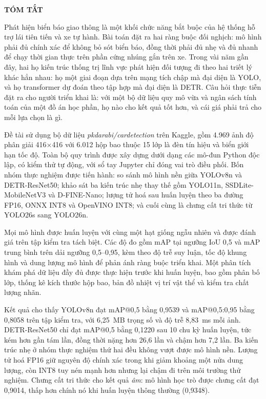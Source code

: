 \newpage
\thispagestyle{plain}

\begin{center}
    {\bfseries\Large TÓM TẮT}
\end{center}

\vspace{1cm}

Phát hiện biển báo giao thông là một khối chức năng bắt buộc của hệ thống hỗ trợ lái tiên tiến và
xe tự hành. Bài toán đặt ra hai ràng buộc đối nghịch: mô hình phải đủ chính xác để không bỏ sót
biển báo, đồng thời phải đủ nhẹ và đủ nhanh để chạy thời gian thực trên phần cứng nhúng gắn trên
xe. Trong vài năm gần đây, hai họ kiến trúc thống trị lĩnh vực phát hiện đối tượng đi theo hai
triết lý khác hẳn nhau: họ một giai đoạn dựa trên mạng tích chập mà đại diện là YOLO, và họ
transformer dự đoán theo tập hợp mà đại diện là DETR. Câu hỏi thực tiễn đặt ra cho người triển
khai là: với một bộ dữ liệu quy mô vừa và ngân sách tính toán của một đồ án học phần, họ nào cho
kết quả tốt hơn, và cái giá phải trả cho mỗi lựa chọn là gì.

Đề tài sử dụng bộ dữ liệu \textit{pkdarabi/cardetection} trên Kaggle, gồm 4.969 ảnh độ phân giải
416$\times$416 với 6.012 hộp bao thuộc 15 lớp là đèn tín hiệu và biển giới hạn tốc độ. Toàn bộ quy
trình được xây dựng dưới dạng các mô-đun Python độc lập, có kiểm thử tự động, với sổ tay Jupyter
chỉ đóng vai trò điều phối. Bốn nhóm thực nghiệm được tiến hành: so sánh mô hình nền giữa YOLOv8n
và DETR-ResNet50; khảo sát ba kiến trúc nhẹ thay thế gồm YOLO11n, SSDLite-MobileNetV3 và
D-FINE-Nano; lượng tử hoá sau huấn luyện theo ba đường FP16, ONNX INT8 và OpenVINO INT8; và cuối
cùng là chưng cất tri thức từ YOLO26s sang YOLO26n.

Mọi mô hình được huấn luyện với cùng một hạt giống ngẫu nhiên và được đánh giá trên tập kiểm tra
tách biệt. Các độ đo gồm mAP tại ngưỡng IoU 0,5 và mAP trung bình trên dải ngưỡng 0,5--0,95, kèm
theo độ trễ suy luận, tốc độ khung hình và dung lượng mô hình để phản ánh ràng buộc triển khai.
Một phân tích khám phá dữ liệu đầy đủ được thực hiện trước khi huấn luyện, bao gồm phân bố lớp,
thống kê kích thước hộp bao, bản đồ nhiệt vị trí vật thể và kiểm tra chất lượng nhãn.

Kết quả cho thấy YOLOv8n đạt mAP@0,5 bằng 0,9539 và mAP@0,5:0,95 bằng 0,8058 trên tập kiểm tra,
với 6,25~MB trọng số và độ trễ 8,83~ms mỗi ảnh. DETR-ResNet50 chỉ đạt mAP@0,5 bằng 0,1220 sau 10
chu kỳ huấn luyện, tức kém hơn gần tám lần, đồng thời nặng hơn 26,6 lần và chậm hơn 7,2
lần. Ba kiến trúc nhẹ ở nhóm thực nghiệm thứ hai đều không vượt được mô hình nền. Lượng tử hoá
FP16 giữ nguyên độ chính xác trong khi giảm khoảng một nửa dung lượng, còn INT8 tuy nén mạnh hơn
nhưng lại chậm đi trên môi trường thử nghiệm. Chưng cất tri thức cho kết quả \emph{âm}: mô hình
học trò được chưng cất đạt 0,9014, thấp hơn chính nó khi huấn luyện thông thường (0,9348).

